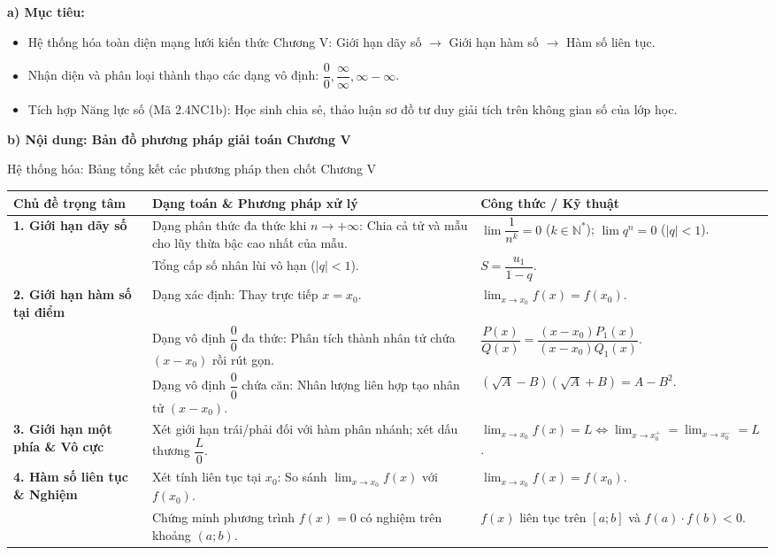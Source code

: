 \documentclass[12pt, a4paper]{article}
\begin{document}
\noindent \textbf{a) Mục tiêu:}
\begin{itemize}[leftmargin=0.6cm]
    \item Hệ thống hóa toàn diện mạng lưới kiến thức Chương V: Giới hạn dãy số $\to$ Giới hạn hàm số $\to$ Hàm số liên tục.
    \item Nhận diện và phân loại thành thạo các dạng vô định: $\dfrac{0}{0}, \dfrac{\infty}{\infty}, \infty - \infty$.
    \item Tích hợp Năng lực số (Mã 2.4NC1b): Học sinh chia sẻ, thảo luận sơ đồ tư duy giải tích trên không gian số của lớp học.
\end{itemize}

\noindent \textbf{b) Nội dung: Bản đồ phương pháp giải toán Chương V}

\begin{pedabox}{Hệ thống hóa: Bảng tổng kết các phương pháp then chốt Chương V}
\small
\begin{tabularx}{\textwidth}{|p{3.5cm}|p{6.2cm}|X|}
\hline
\textbf{Chủ đề trọng tâm} & \textbf{Dạng toán \& Phương pháp xử lý} & \textbf{Công thức / Kỹ thuật} \\ \hline
\textbf{1. Giới hạn dãy số} & Dạng phân thức đa thức khi $n \to +\infty$: Chia cả tử và mẫu cho lũy thừa bậc cao nhất của mẫu. & $\lim \dfrac{1}{n^k} = 0$ ($k \in \mathbb{N}^*$); $\lim q^n = 0$ ($|q| < 1$). \\ \cline{2-3}
& Tổng cấp số nhân lùi vô hạn ($|q| < 1$). & $S = \dfrac{u_1}{1 - q}$. \\ \hline
\textbf{2. Giới hạn hàm số tại điểm} & Dạng xác định: Thay trực tiếp $x = x_0$. & $\lim_{x \to x_0} f(x) = f(x_0)$. \\ \cline{2-3}
& Dạng vô định $\dfrac{0}{0}$ đa thức: Phân tích thành nhân tử chứa $(x - x_0)$ rồi rút gọn. & $\dfrac{P(x)}{Q(x)} = \dfrac{(x - x_0)P_1(x)}{(x - x_0)Q_1(x)}$. \\ \cline{2-3}
& Dạng vô định $\dfrac{0}{0}$ chứa căn: Nhân lượng liên hợp tạo nhân tử $(x - x_0)$. & $(\sqrt{A} - B)(\sqrt{A} + B) = A - B^2$. \\ \hline
\textbf{3. Giới hạn một phía \& Vô cực} & Xét giới hạn trái/phải đối với hàm phân nhánh; xét dấu thương $\dfrac{L}{0}$. & $\lim_{x \to x_0} f(x) = L \iff \lim_{x \to x_0^+} = \lim_{x \to x_0^-} = L$. \\ \hline
\textbf{4. Hàm số liên tục \& Nghiệm} & Xét tính liên tục tại $x_0$: So sánh $\lim_{x \to x_0} f(x)$ với $f(x_0)$. & $\lim_{x \to x_0} f(x) = f(x_0)$. \\ \cline{2-3}
& Chứng minh phương trình $f(x) = 0$ có nghiệm trên khoảng $(a; b)$. & $f(x)$ liên tục trên $[a; b]$ và $f(a) \cdot f(b) < 0$. \\ \hline
\end{tabularx}
\end{pedabox}
\end{document}

